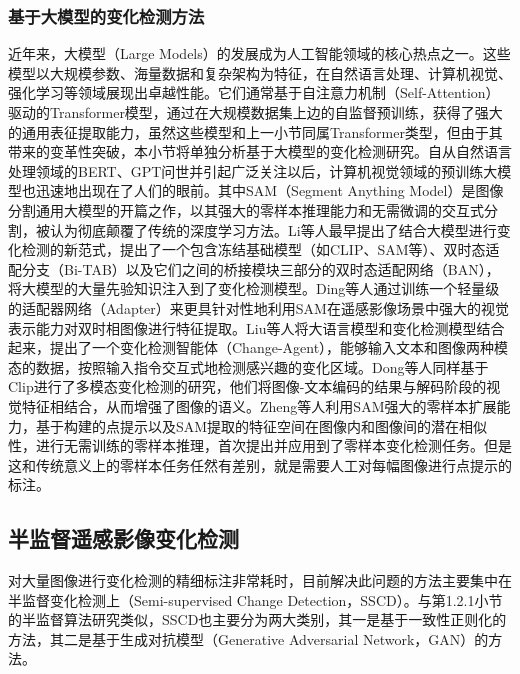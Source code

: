 \documentclass[lang=chs, degree=master, blindreview=false, adobe=false]{yanputhesis}
\begin{document}
\subsubsection{基于大模型的变化检测方法}
近年来，大模型（Large Models）的发展成为人工智能领域的核心热点之一。这些模型以大规模参数、海量数据和复杂架构为特征，在自然语言处理、计算机视觉、强化学习等领域展现出卓越性能。它们通常基于自注意力机制（Self-Attention）驱动的Transformer模型，通过在大规模数据集上边的自监督预训练，获得了强大的通用表征提取能力，虽然这些模型和上一小节同属Transformer类型，但由于其带来的变革性突破，本小节将单独分析基于大模型的变化检测研究。自从自然语言处理领域的BERT、GPT问世并引起广泛关注以后，计算机视觉领域的预训练大模型也迅速地出现在了人们的眼前。其中SAM\cite{kirillov2023SAM}（Segment Anything Model）是图像分割通用大模型的开篇之作，以其强大的零样本推理能力和无需微调的交互式分割，被认为彻底颠覆了传统的深度学习方法。Li等人\cite{li2024LM}最早提出了结合大模型进行变化检测的新范式，提出了一个包含冻结基础模型（如CLIP\cite{radford2021clip}、SAM等）、双时态适配分支（Bi-TAB）以及它们之间的桥接模块三部分的双时态适配网络（BAN），将大模型的大量先验知识注入到了变化检测模型。Ding等人\cite{ding2024SAMCD}通过训练一个轻量级的适配器网络（Adapter）来更具针对性地利用SAM在遥感影像场景中强大的视觉表示能力对双时相图像进行特征提取。Liu等人\cite{liu2024changeagent}将大语言模型和变化检测模型结合起来，提出了一个变化检测智能体（Change-Agent），能够输入文本和图像两种模态的数据，按照输入指令交互式地检测感兴趣的变化区域。Dong等人\cite{dong2024changeclip}同样基于Clip进行了多模态变化检测的研究，他们将图像-文本编码的结果与解码阶段的视觉特征相结合，从而增强了图像的语义。Zheng等人\cite{zheng2024SAC}利用SAM强大的零样本扩展能力，基于构建的点提示以及SAM提取的特征空间在图像内和图像间的潜在相似性，进行无需训练的零样本推理，首次提出并应用到了零样本变化检测任务。但是这和传统意义上的零样本任务任然有差别，就是需要人工对每幅图像进行点提示的标注。
\subsection{半监督遥感影像变化检测}
对大量图像进行变化检测的精细标注非常耗时，目前解决此问题的方法主要集中在半监督变化检测上（Semi-supervised Change Detection，SSCD）。与第1.2.1小节的半监督算法研究类似，SSCD也主要分为两大类别，其一是基于一致性正则化的方法，其二是基于生成对抗模型（Generative Adversarial Network，GAN）的方法。
\end{document}
